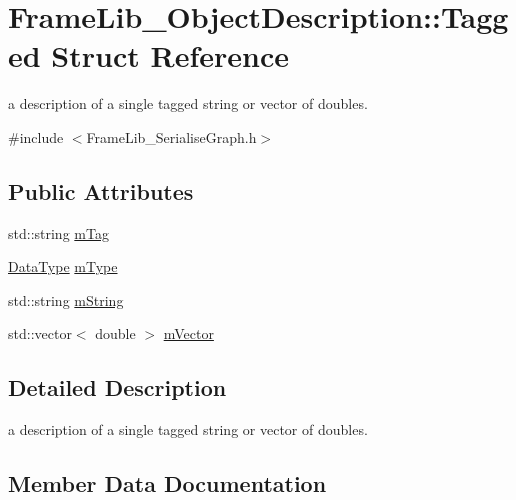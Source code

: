 \hypertarget{struct_frame_lib___object_description_1_1_tagged}{}\section{Frame\+Lib\+\_\+\+Object\+Description\+:\+:Tagged Struct Reference}
\label{struct_frame_lib___object_description_1_1_tagged}


a description of a single tagged string or vector of doubles.  




{\ttfamily \#include $<$Frame\+Lib\+\_\+\+Serialise\+Graph.\+h$>$}

\subsection*{Public Attributes}
\begin{DoxyCompactItemize}
\item 
std\+::string \hyperlink{struct_frame_lib___object_description_1_1_tagged_a3ec5185ab4b40e11772a588a5882b2ff}{m\+Tag}
\item 
\hyperlink{_frame_lib___types_8h_ad8ed01ff3ff33333d8e19db4d2818bb6}{Data\+Type} \hyperlink{struct_frame_lib___object_description_1_1_tagged_a322aff7281f1fc5eed5c3527369648c9}{m\+Type}
\item 
std\+::string \hyperlink{struct_frame_lib___object_description_1_1_tagged_a5c8bc5489038a497aa31ced6b4019f52}{m\+String}
\item 
std\+::vector$<$ double $>$ \hyperlink{struct_frame_lib___object_description_1_1_tagged_a7767f2ce2bbe68c35071b5415d972ec7}{m\+Vector}
\end{DoxyCompactItemize}


\subsection{Detailed Description}
a description of a single tagged string or vector of doubles. 

\subsection{Member Data Documentation}
\mbox{\label{struct_frame_lib___object_description_1_1_tagged_a5c8bc5489038a497aa31ced6b4019f52}} 

